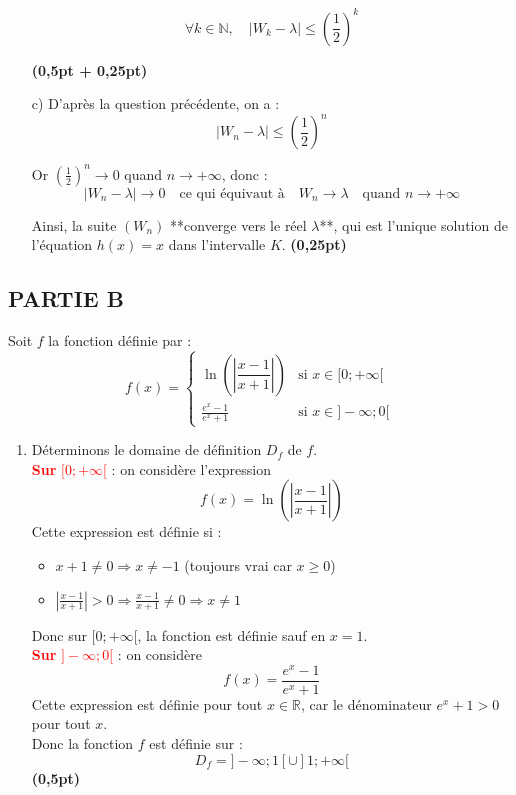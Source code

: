 \documentclass[12pt]{article}
\begin{document}
\begin{enumerate}
\[
\forall k \in \mathbb{N},\quad |W_k - \lambda| \leq \left( \frac{1}{2} \right)^k
\]

\hfill \textbf{(0,5pt + 0,25pt)}
\item[c)] D’après la question précédente, on a :
\[
|W_n - \lambda| \leq \left( \frac{1}{2} \right)^n
\]

Or \( \left( \frac{1}{2} \right)^n \to 0 \) quand \( n \to +\infty \), donc :
\[
|W_n - \lambda| \to 0
\quad \text{ce qui équivaut à} \quad
W_n \to \lambda
\quad \text{quand } n \to +\infty
\]

Ainsi, la suite \( (W_n) \) **converge vers le réel \( \lambda \)**, qui est l’unique solution de l’équation \( h(x) = x \) dans l’intervalle \( K \). \hfill \textbf{(0,25pt)}

\end{enumerate}

\subsection*{PARTIE B}

Soit \( f \) la fonction définie par :
\[
f(x) =
\begin{cases}
\ln\left( \left| \dfrac{x - 1}{x + 1} \right| \right) & \text{si } x \in [0 ; +\infty[ \\
\displaystyle \frac{e^x - 1}{e^x + 1} & \text{si } x \in ]-\infty ; 0[
\end{cases}
\]

\begin{enumerate}
    \item Déterminons le domaine de définition \( D_f \) de \( f \).\\

    \textcolor{red}{\textbf{Sur } \( [0 ; +\infty[ \)} : on considère l’expression
    \[
    f(x) = \ln\left( \left| \frac{x - 1}{x + 1} \right| \right)
    \]
    Cette expression est définie si :
    \begin{itemize}
        \item \( x + 1 \neq 0 \Rightarrow x \neq -1 \) (toujours vrai car \( x \geq 0 \))
        \item \( \left| \frac{x - 1}{x + 1} \right| > 0 \Rightarrow \frac{x - 1}{x + 1} \neq 0 \Rightarrow x \neq 1 \)
    \end{itemize}
    Donc sur \( [0 ; +\infty[ \), la fonction est définie sauf en \( x = 1 \).\\

    \textcolor{red}{\textbf{Sur } \( ]-\infty ; 0[ \)} : on considère
    \[
    f(x) = \frac{e^x - 1}{e^x + 1}
    \]
    Cette expression est définie pour tout \( x \in \mathbb{R} \), car le dénominateur \( e^x + 1 > 0 \) pour tout \( x \).\\

    Donc la fonction \( f \) est définie sur :
    \[
    D_f = ]-\infty ; 1[ \cup ]1 ; +\infty[
    \]
    \hfill \textbf{(0,5pt)}
\end{enumerate}
\end{document}
